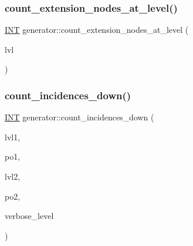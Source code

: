 \mbox{\label{classgenerator_a51ae16bc53402495663479269fc0bee0}} 
\subsubsection{\texorpdfstring{count\+\_\+extension\+\_\+nodes\+\_\+at\+\_\+level()}{count\_extension\_nodes\_at\_level()}}
{\footnotesize\ttfamily \mbox{\hyperlink{galois_8h_a09fddde158a3a20bd2dcadb609de11dc}{I\+NT}} generator\+::count\+\_\+extension\+\_\+nodes\+\_\+at\+\_\+level (\begin{DoxyParamCaption}\item[{\mbox{\hyperlink{galois_8h_a09fddde158a3a20bd2dcadb609de11dc}{I\+NT}}}]{lvl }\end{DoxyParamCaption})}

\mbox{\label{classgenerator_aef9312d2eab8e5ff47228fc5cdab3262}} 
\subsubsection{\texorpdfstring{count\+\_\+incidences\+\_\+down()}{count\_incidences\_down()}}
{\footnotesize\ttfamily \mbox{\hyperlink{galois_8h_a09fddde158a3a20bd2dcadb609de11dc}{I\+NT}} generator\+::count\+\_\+incidences\+\_\+down (\begin{DoxyParamCaption}\item[{\mbox{\hyperlink{galois_8h_a09fddde158a3a20bd2dcadb609de11dc}{I\+NT}}}]{lvl1,  }\item[{\mbox{\hyperlink{galois_8h_a09fddde158a3a20bd2dcadb609de11dc}{I\+NT}}}]{po1,  }\item[{\mbox{\hyperlink{galois_8h_a09fddde158a3a20bd2dcadb609de11dc}{I\+NT}}}]{lvl2,  }\item[{\mbox{\hyperlink{galois_8h_a09fddde158a3a20bd2dcadb609de11dc}{I\+NT}}}]{po2,  }\item[{\mbox{\hyperlink{galois_8h_a09fddde158a3a20bd2dcadb609de11dc}{I\+NT}}}]{verbose\+\_\+level }\end{DoxyParamCaption})}

